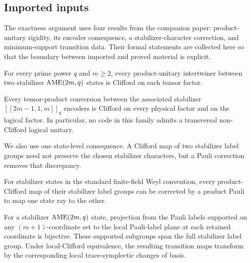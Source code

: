 \subsection*{Imported inputs}

The exactness argument uses four results from the companion paper:
product-unitary rigidity, its encoder consequence, a stabilizer-character
correction, and minimum-support transition data.  Their formal statements are
collected here so that the boundary between imported and proved material is
explicit.

\begin{theorem}
\label{thm:lu-lc-rigidity}
For every prime power \(q\) and \(m\geq2\), every product-unitary
intertwiner between two stabilizer \(\mathrm{AME}(2m,q)\) states is Clifford on each
tensor factor.
\end{theorem}

\begin{corollary}
\label{cor:transversal-clifford}
Every tensor-product conversion between the associated stabilizer
\([[2m-1,1,m]]_q\) encoders is Clifford on every physical factor and on the
logical factor.  In particular, no code in this family admits a transversal
non-Clifford logical unitary.
\end{corollary}

We also use one state-level consequence.  A Clifford map of two stabilizer
label groups need not preserve the chosen stabilizer characters, but a Pauli
correction removes that discrepancy.
\begin{lemma}
\label{lem:pauli-phase-correction}
For stabilizer states in the standard finite-field Weyl convention, every
product-Clifford map of their stabilizer label groups can be corrected by a
product Pauli to map one state ray to the other.
\end{lemma}

\begin{theorem}
\label{thm:minimum-support-transitions}
For a stabilizer \(\mathrm{AME}(2m,q)\) state, projection from the Pauli labels
supported on any \((m+1)\)-coordinate set to the local Pauli-label plane at
each retained coordinate is bijective.  These supported subgroups span the
full stabilizer label group.  Under local-Clifford equivalence, the resulting
transition maps transform by the corresponding local trace-symplectic changes
of basis.
\end{theorem}

